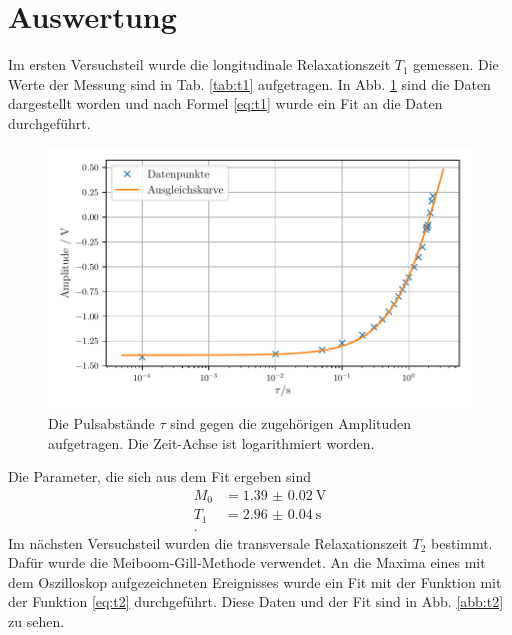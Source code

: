 \section{Auswertung}

Im ersten Versuchsteil wurde die longitudinale Relaxationszeit $T_1$ gemessen. 
Die Werte der Messung sind in Tab. \ref{tab:t1} aufgetragen. 
In Abb. \ref{abb:t1} sind die Daten dargestellt worden und nach Formel \eqref{eq:t1} wurde ein Fit an die Daten durchgeführt.



\begin{figure}
    \centering
    \includegraphics[width=\textwidth]{plots/T1.pdf}
    \caption{Die Pulsabstände $\tau$ sind gegen die zugehörigen Amplituden aufgetragen. Die Zeit-Achse ist logarithmiert worden.}
    \label{abb:t1}
\end{figure}

Die Parameter, die sich aus dem Fit ergeben sind 
\begin{align*}
    M_0 &= \SI{1.39(2)}{\volt} \\
    T_1 &= \SI{2.96(4)}{\second} \\.
\end{align*}
Im nächsten Versuchsteil wurden die transversale Relaxationszeit $T_2$ bestimmt. 
Dafür wurde die Meiboom-Gill-Methode verwendet. An die Maxima eines mit dem Oszilloskop aufgezeichneten Ereignisses wurde ein Fit mit der Funktion mit der Funktion \eqref{eq:t2} durchgeführt. Diese Daten und der Fit sind in Abb. \ref{abb:t2} zu sehen. 

